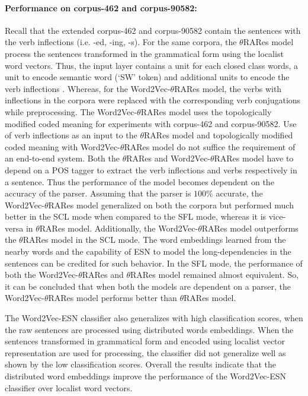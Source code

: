 \paragraph{Performance on corpus-462 and corpus-90582:} Recall that the extended corpus-462 and corpus-90582 contain the sentences with the verb inflections (i.e. -ed, -ing, -s). For the same corpora, the $\theta$RARes model process the sentences transformed in the grammatical form using the localist word vectors. Thus, the input layer contains a unit for each closed class words, a unit to encode semantic word (`SW' token) and additional units to encode the verb inflections \cite{xavier:2013:RT}. Whereas, for the Word2Vec-$\theta$RARes model, the verbs with inflections in the corpora were replaced with the corresponding verb conjugations while preprocessing. The Word2Vec-$\theta$RARes model uses the topologically modified coded meaning for experiments with corpus-462 and corpus-90582. Use of verb inflections as an input to the $\theta$RARes model and topologically modified coded meaning with Word2Vec-$\theta$RARes model do not suffice the requirement of an end-to-end system. Both the $\theta$RARes and Word2Vec-$\theta$RARes model have to depend on a POS tagger to extract the verb inflections and verbs respectively in a sentence. Thus the performance of the model becomes dependent on the accuracy of the parser. Assuming that the parser is $100\%$ accurate, the Word2Vec-$\theta$RARes model generalized on both the corpora but performed much better in the SCL mode when compared to the SFL mode, whereas it is vice-versa in $\theta$RARes model. Additionally, the Word2Vec-$\theta$RARes model outperforms the $\theta$RARes model in the SCL mode. The word embeddings learned from the nearby words and the capability of ESN to model the long-dependencies in the sentences can be credited for such behavior. In the SFL mode, the performance of both the Word2Vec-$\theta$RARes and $\theta$RARes model remained almost equivalent. So, it can be concluded that when both the models are dependent on a parser, the Word2Vec-$\theta$RARes model performs better than $\theta$RARes model.

The Word2Vec-ESN classifier also generalizes with high classification scores, when the raw sentences are processed using distributed words embeddings. When the sentences transformed in grammatical form and encoded using localist vector representation are used for processing, the classifier did not generalize well as shown by the low classification scores. Overall the results indicate that the distributed word embeddings improve the performance of the Word2Vec-ESN classifier over localist word vectors.

